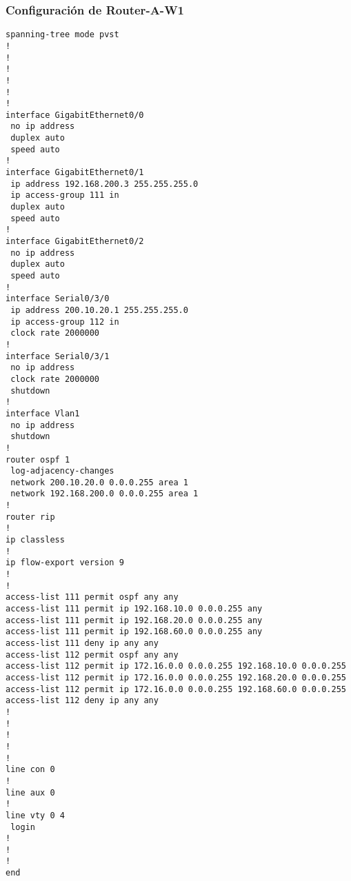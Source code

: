 \documentclass[a4paper,onecolumn,11pt]{article}
\begin{document}
\subsubsection{Configuración de Router-A-W1}
{
\footnotesize \sffamily
\begin{verbatim}
spanning-tree mode pvst
!
!
!
!
!
!
interface GigabitEthernet0/0
 no ip address
 duplex auto
 speed auto
!
interface GigabitEthernet0/1
 ip address 192.168.200.3 255.255.255.0
 ip access-group 111 in
 duplex auto
 speed auto
!
interface GigabitEthernet0/2
 no ip address
 duplex auto
 speed auto
!
interface Serial0/3/0
 ip address 200.10.20.1 255.255.255.0
 ip access-group 112 in
 clock rate 2000000
!
interface Serial0/3/1
 no ip address
 clock rate 2000000
 shutdown
!
interface Vlan1
 no ip address
 shutdown
!
router ospf 1
 log-adjacency-changes
 network 200.10.20.0 0.0.0.255 area 1
 network 192.168.200.0 0.0.0.255 area 1
!
router rip
!
ip classless
!
ip flow-export version 9
!
!
access-list 111 permit ospf any any
access-list 111 permit ip 192.168.10.0 0.0.0.255 any
access-list 111 permit ip 192.168.20.0 0.0.0.255 any
access-list 111 permit ip 192.168.60.0 0.0.0.255 any
access-list 111 deny ip any any
access-list 112 permit ospf any any
access-list 112 permit ip 172.16.0.0 0.0.0.255 192.168.10.0 0.0.0.255
access-list 112 permit ip 172.16.0.0 0.0.0.255 192.168.20.0 0.0.0.255
access-list 112 permit ip 172.16.0.0 0.0.0.255 192.168.60.0 0.0.0.255
access-list 112 deny ip any any
!
!
!
!
!
line con 0
!
line aux 0
!
line vty 0 4
 login
!
!
!
end
\end{verbatim}
}








\end{document}
